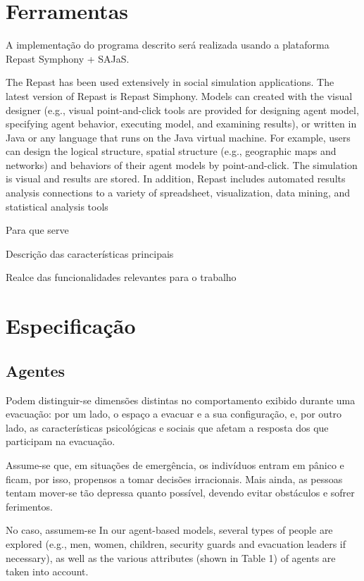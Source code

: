\documentclass[12pt]{article}
\begin{document}
\begin{titlepage}
\section{Ferramentas}
A implementação do programa descrito será realizada usando a plataforma Repast Symphony + SAJaS.

The Repast has been used extensively in social simulation applications. The latest
version of Repast is Repast Simphony. Models can created with the visual designer
(e.g., visual point-and-click tools are provided for designing agent model, specifying
agent behavior, executing model, and examining results), or written in Java or any
language that runs on the Java virtual machine. For example, users can design the
logical structure, spatial structure (e.g., geographic maps and networks) and behaviors
of their agent models by point-and-click. The simulation is visual and results are
stored. In addition, Repast includes automated results analysis connections to a
variety of spreadsheet, visualization, data mining, and statistical analysis tools 

Para que serve

Descrição das características principais

Realce das funcionalidades relevantes para o trabalho


\section{Especificação}
\subsection{Agentes}

Podem distinguir-se dimensões distintas no comportamento exibido durante uma evacuação: por um lado, o espaço a evacuar e a sua configuração, e, por outro lado, as características psicológicas e sociais que afetam a resposta dos que participam na evacuação.

Assume-se que, em situações de emergência, os indivíduos entram em pânico e ficam, por isso, propensos a tomar decisões irracionais. Mais ainda, as pessoas tentam mover-se tão depressa quanto possível, devendo evitar obstáculos e sofrer ferimentos.

No caso, assumem-se 
In our agent-based models, several types of people are explored (e.g., men, women,
children, security guards and evacuation leaders if necessary), as well as the various
attributes (shown in Table 1) of agents are taken into account. 


\end{titlepage}
\end{document}
